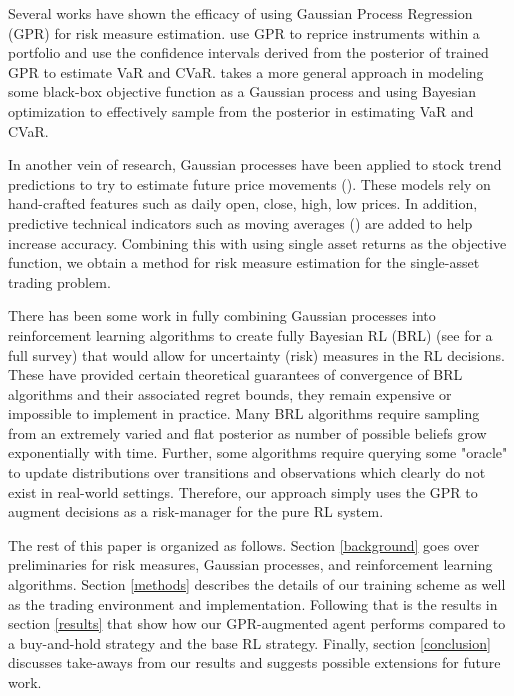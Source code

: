 \documentclass[12pt]{article}
\begin{document}
Several works have shown the efficacy of using Gaussian Process Regression (GPR) for risk measure estimation. \cite{Wilkens2019} use GPR to reprice instruments within a portfolio and use the confidence intervals derived from the posterior of trained GPR to estimate VaR and CVaR. \cite{Cakmak2020} takes a more general approach in modeling some black-box objective function as a Gaussian process and using Bayesian optimization to effectively sample from the posterior in estimating VaR and CVaR.

In another vein of research, Gaussian processes have been applied to stock trend predictions to try to estimate future price movements (\cite{Farrel2007}). These models rely on hand-crafted features such as daily open, close, high, low prices. In addition, predictive technical indicators such as moving averages (\cite{Park2007}) are added to help increase accuracy. Combining this with \cite{Cakmak2020} using single asset returns as the objective function, we obtain a method for risk measure estimation for the single-asset trading problem.

There has been some work in fully combining Gaussian processes into reinforcement learning algorithms to create fully Bayesian RL (BRL) (see \cite{Ghavamzadeh2016} for a full survey) that would allow for uncertainty (risk) measures in the RL decisions. These have provided certain theoretical guarantees of convergence of BRL algorithms and their associated regret bounds, they remain expensive or impossible to implement in practice. Many BRL algorithms require sampling from an extremely varied and flat posterior as number of possible beliefs grow exponentially with time. Further, some algorithms require querying some "oracle" to update distributions over transitions and observations which clearly do not exist in real-world settings. Therefore, our approach simply uses the GPR to augment decisions as a risk-manager for the pure RL system.

The rest of this paper is organized as follows. Section \ref{background} goes over preliminaries for risk measures, Gaussian processes, and reinforcement learning algorithms. Section \ref{methods} describes the details of our training scheme as well as the trading environment and implementation. Following that is the results in section \ref{results} that show how our GPR-augmented agent performs compared to a buy-and-hold strategy and the base RL strategy. Finally, section \ref{conclusion} discusses take-aways from our results and suggests possible extensions for future work.
\end{document}
